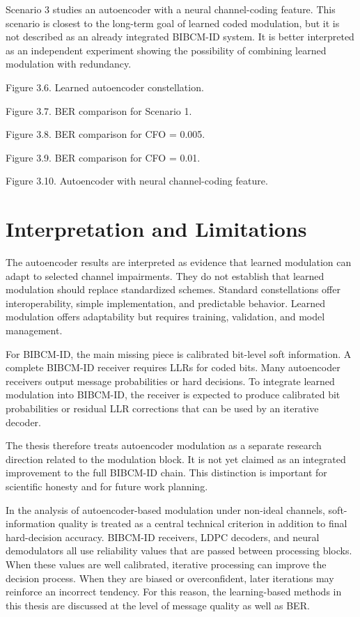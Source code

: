 Scenario 3 studies an autoencoder with a neural channel-coding feature. This scenario is closest to the long-term goal of learned coded modulation, but it is not described as an already integrated BIBCM-ID system. It is better interpreted as an independent experiment showing the possibility of combining learned modulation with redundancy.

Figure 3.6. Learned autoencoder constellation.

Figure 3.7. BER comparison for Scenario 1.

Figure 3.8. BER comparison for CFO = 0.005.

Figure 3.9. BER comparison for CFO = 0.01.

Figure 3.10. Autoencoder with neural channel-coding feature.

\section{Interpretation and Limitations}
The autoencoder results are interpreted as evidence that learned modulation can adapt to selected channel impairments. They do not establish that learned modulation should replace standardized schemes. Standard constellations offer interoperability, simple implementation, and predictable behavior. Learned modulation offers adaptability but requires training, validation, and model management.

For BIBCM-ID, the main missing piece is calibrated bit-level soft information. A complete BIBCM-ID receiver requires LLRs for coded bits. Many autoencoder receivers output message probabilities or hard decisions. To integrate learned modulation into BIBCM-ID, the receiver is expected to produce calibrated bit probabilities or residual LLR corrections that can be used by an iterative decoder.

The thesis therefore treats autoencoder modulation as a separate research direction related to the modulation block. It is not yet claimed as an integrated improvement to the full BIBCM-ID chain. This distinction is important for scientific honesty and for future work planning.

In the analysis of autoencoder-based modulation under non-ideal channels, soft-information quality is treated as a central technical criterion in addition to final hard-decision accuracy. BIBCM-ID receivers, LDPC decoders, and neural demodulators all use reliability values that are passed between processing blocks. When these values are well calibrated, iterative processing can improve the decision process. When they are biased or overconfident, later iterations may reinforce an incorrect tendency. For this reason, the learning-based methods in this thesis are discussed at the level of message quality as well as BER.

